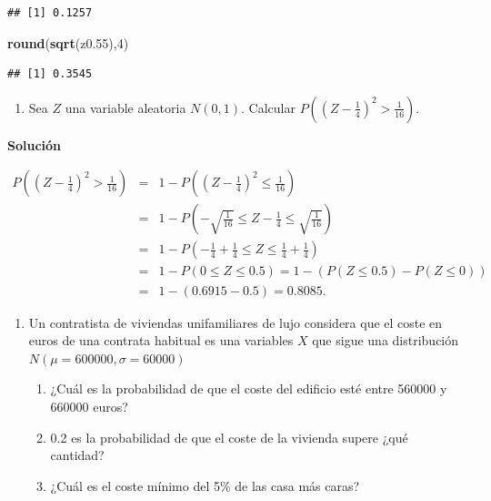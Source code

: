 \documentclass[
]{article}
\newenvironment{Shaded}{\begin{snugshade}}{\end{snugshade}}
\newcommand{\DecValTok}[1]{\textcolor[rgb]{0.00,0.00,0.81}{#1}}
\newcommand{\FloatTok}[1]{\textcolor[rgb]{0.00,0.00,0.81}{#1}}
\newcommand{\KeywordTok}[1]{\textcolor[rgb]{0.13,0.29,0.53}{\textbf{#1}}}
\newcommand{\NormalTok}[1]{#1}
\providecommand{\tightlist}{%
  \setlength{\itemsep}{0pt}\setlength{\parskip}{0pt}}
\begin{document}
\begin{verbatim}
## [1] 0.1257
\end{verbatim}

\begin{Shaded}
\begin{Highlighting}[]
\KeywordTok{round}\NormalTok{(}\KeywordTok{sqrt}\NormalTok{(z0}\FloatTok{.55}\NormalTok{),}\DecValTok{4}\NormalTok{)}
\end{Highlighting}
\end{Shaded}

\begin{verbatim}
## [1] 0.3545
\end{verbatim}

\newpage

\begin{enumerate}
\def\labelenumi{\arabic{enumi}.}
\setcounter{enumi}{4}
\tightlist
\item
  Sea \(Z\) una variable aleatoria \(N(0,1)\). Calcular
  \(P\left(\left(Z-\frac{1}{4}\right)^2 >\frac{1}{16}\right)\).
\end{enumerate}

\textbf{Solución}

\begin{eqnarray*}
P\left(\left(Z-\frac{1}{4}\right)^2 >\frac{1}{16}\right)&=& 1-P\left(\left(Z-\frac{1}{4}\right)^2 \leq \frac{1}{16}\right)\\
&=&
1-P\left(-\sqrt{\frac{1}{16}}\leq Z-\frac{1}{4}\leq\sqrt{\frac{1}{16}} \right)\\
&=&
1-P\left(-\frac{1}{4}+\frac14\leq Z\leq  \frac{1}{4}+\frac14\right)\\
&=&
1-P(0\leq Z\leq 0.5 )=1-(P(Z\leq 0.5)-P(Z\leq 0))\\
&=& 1-(0.6915-0.5)=
0.8085.
\end{eqnarray*}

\newpage

\begin{enumerate}
\def\labelenumi{\arabic{enumi}.}
\setcounter{enumi}{5}
\tightlist
\item
  Un contratista de viviendas unifamiliares de lujo considera que el
  coste en euros de una contrata habitual es una variables \(X\) que
  sigue una distribución \(N(\mu=600000,\sigma=60000)\)

  \begin{enumerate}
  \def\labelenumii{\alph{enumii}.}
  \tightlist
  \item
    ¿Cuál es la probabilidad de que el coste del edificio esté entre
    560000 y 660000 euros?
  \item
    0.2 es la probabilidad de que el coste de la vivienda supere ¿qué
    cantidad?
  \item
    ¿Cuál es el coste mínimo del 5\% de las casa más caras?
  \end{enumerate}
\end{enumerate}
\end{document}
